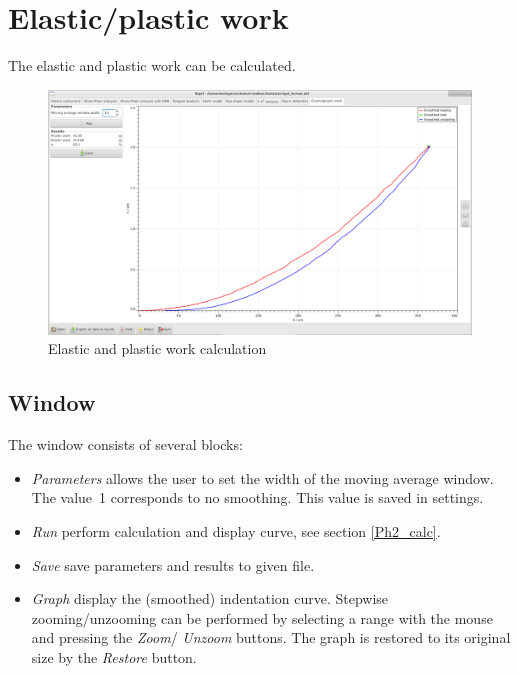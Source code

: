 \section{Elastic/plastic work} \label{work}
The elastic and plastic work can be calculated.

\begin{figure}[ht]
  \centering
  \includegraphics[width=\textwidth]{images/screen-work}
  \caption{Elastic and plastic work calculation}
\end{figure}

\subsection{Window}
The window consists of several blocks:
\begin{itemize}
 \item \emph{Parameters} allows the user to set the width of the moving average window. The value~1 corresponds to no smoothing. This value is saved in settings. 
 \item \emph{Run}  perform calculation and display curve, see section \ref{Ph2_calc}. 
 \item \emph{Save} save parameters and results to given file. 
 \item \emph{Graph}  display the (smoothed) indentation curve. 
 Stepwise zooming/unzooming can be performed by selecting a range with the mouse and pressing the \emph{Zoom}/ \emph{Unzoom} buttons. 
		     The graph is restored to its original size by the \emph{Restore} button. 
  \end{itemize}

